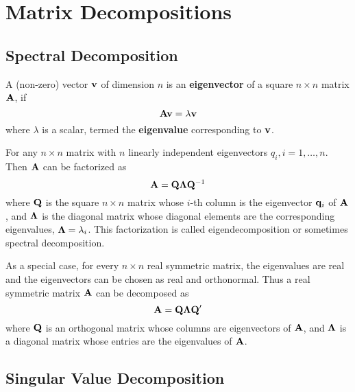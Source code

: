 \chapter{Matrix Decompositions}
\label{chapter:matrix-decompositions}

\section{Spectral Decomposition}

\begin{definition}
	A (non-zero) vector ${\bf v}$ of dimension $n$ is an \textbf{eigenvector} of a square $n\times n$ matrix ${\bf A}$, if
	\begin{equation}
		{\bf A}{\bf v}=\lambda{\bf v}
	\end{equation}
	where $\lambda$ is a scalar, termed the \textbf{eigenvalue} corresponding to ${\bf v}$.
\end{definition}

\begin{definition}
	For any $n\times n$ matrix with $n$ linearly independent eigenvectors $q_{i},i=1,\ldots,n$. Then ${\bf A}$ can be factorized as
	\begin{equation*}
		{\bf A}={\bf Q}\boldsymbol{\Lambda}{\bf Q}^{-1}
	\end{equation*}
	where ${\bf Q}$ is the square $n\times n$ matrix whose $i$-th column is the eigenvector ${\bf q}_{i}$ of ${\bf A}$, and $\boldsymbol{\Lambda}$ is the diagonal matrix whose diagonal elements are the corresponding eigenvalues, $\boldsymbol{\Lambda}=\lambda_{i}$. This factorization is called eigendecomposition or sometimes spectral decomposition.
\end{definition}

\begin{example}
	As a special case, for every $n\times n$ real symmetric matrix, the eigenvalues are real and the eigenvectors can be chosen as real and orthonormal. Thus a real symmetric matrix ${\bf A}$ can be decomposed as
	\begin{equation}
		{\bf A}={\bf Q}\boldsymbol{\Lambda}{\bf Q}^{\prime}
	\end{equation}
	where ${\bf Q}$ is an orthogonal matrix whose columns are  eigenvectors of ${\bf A}$, and $\boldsymbol{\Lambda}$ is a diagonal matrix whose entries are the eigenvalues of ${\bf A}$.
\end{example}

\section{Singular Value Decomposition}

